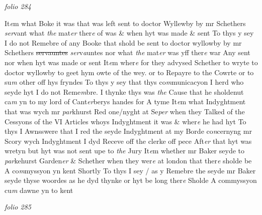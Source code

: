 \documentclass[12pt, a4paper]{book}
\begin{document}
\dotfill
					

\textit{folio 284}



				\marginpar[\vspace{0.5cm}{\textcolor{Gray}{12}}]{}
			 It\textit{e}m what Boke it was that was left sent to doctor Wyllewby by mr Schethers \textit{ser}vant what \textit{the} mat\textit{er} ther\textit{e} of was \& when hyt  was made 
			\& sent To thys y sey I do not Remebre of any Booke that shold be sent  to doctor wyllowby by mr Schethers \sout{servauntes }
               \textit{ser}v\textit{a}untes nor what \textit{the} mat\textit{er} was yff ther\textit{e} war Any sent nor when hyt was made or sent 
				\marginpar[\vspace{0.5cm}{\textcolor{Gray}{13}}]{}
			 It\textit{e}m wher\textit{e} for they advysed Schether to wryte to doctor wyllowby to geet hym owte of the wey. or to Repayre to the Cowrte or to su\textit{m} other off hys fryndes To thys y sey that thys co\textit{m}municacyon I herd who seyde hyt I do not Reme\textit{m}bre. I thynke thys was \textit{the} Cause that he sholdenut ca\textit{m} yn to my lord of Cant\textit{er}berys handes for A tyme 
				\marginpar[\vspace{0.5cm}{\textcolor{Gray}{14}}]{}
			 It\textit{e}m what Indyghtment that was wych mr \textit{par}khurst Red one/nyght at Se\textit{per} when they Talked of the Cessyons of the VI Articles whoys  Indyghtment it was \& wher\textit{e} he had hyt To thys I Awnsswere that I red the seyde Indyghtment at my Borde co\textit{n}cernyng mr Scory wych Indyghtment I dyd Receve off the clerke off  pece Aft\textit{er} that hyt was wretyn but hyt was not sent upe to \textit{the} Jury 
				\marginpar[\vspace{0.5cm}{\textcolor{Gray}{16}}]{}
			 It\textit{e}m whether mr Baker seyde to \textit{par}kehurst Garden\textit{er} \& Schether when they wer\textit{e} at london that ther\textit{e} sholde be A co\textit{m}myssyon yn kent Shortly To thys I sey / as y Remebre the seyde mr Baker seyde thyse woordes as he dyd thynke or hyt be long ther\textit{e} Sholde A commyssyon cu\textit{m} dawne yn to kent

\dotfill
					

\textit{folio 285}
\end{document}
